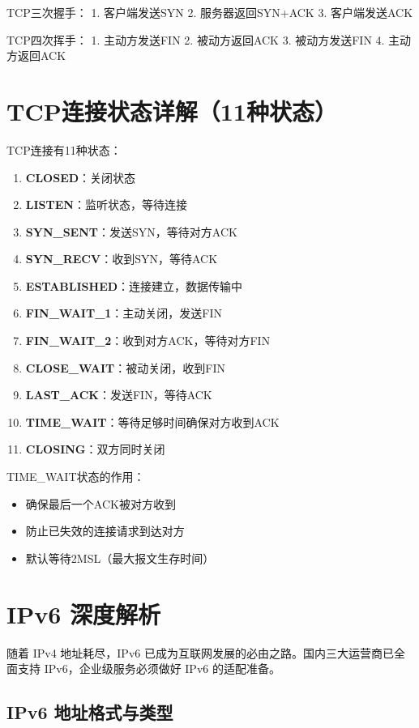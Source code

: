 \documentclass[12pt,UTF8]{ctexbook}
\begin{document}
TCP三次握手：
1. 客户端发送SYN
2. 服务器返回SYN+ACK
3. 客户端发送ACK

TCP四次挥手：
1. 主动方发送FIN
2. 被动方返回ACK
3. 被动方发送FIN
4. 主动方返回ACK

\section{TCP连接状态详解（11种状态）}
\label{sec:tcp-states}

TCP连接有11种状态：

\begin{enumerate}
    \item \textbf{CLOSED}：关闭状态
    \item \textbf{LISTEN}：监听状态，等待连接
    \item \textbf{SYN\_SENT}：发送SYN，等待对方ACK
    \item \textbf{SYN\_RECV}：收到SYN，等待ACK
    \item \textbf{ESTABLISHED}：连接建立，数据传输中
    \item \textbf{FIN\_WAIT\_1}：主动关闭，发送FIN
    \item \textbf{FIN\_WAIT\_2}：收到对方ACK，等待对方FIN
    \item \textbf{CLOSE\_WAIT}：被动关闭，收到FIN
    \item \textbf{LAST\_ACK}：发送FIN，等待ACK
    \item \textbf{TIME\_WAIT}：等待足够时间确保对方收到ACK
    \item \textbf{CLOSING}：双方同时关闭
\end{enumerate}

TIME\_WAIT状态的作用：
\begin{itemize}
    \item 确保最后一个ACK被对方收到
    \item 防止已失效的连接请求到达对方
    \item 默认等待2MSL（最大报文生存时间）
\end{itemize}

\section{IPv6 深度解析}
\label{sec:ipv6}

随着 IPv4 地址耗尽，IPv6 已成为互联网发展的必由之路。国内三大运营商已全面支持 IPv6，企业级服务必须做好 IPv6 的适配准备。

\subsection*{IPv6 地址格式与类型}
\end{document}
